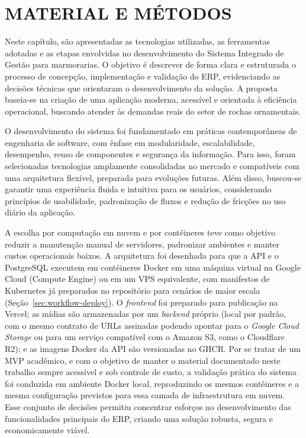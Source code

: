 \chapter{MATERIAL E MÉTODOS}\label{cap3MatMet}
Neste capítulo, são apresentadas as tecnologias utilizadas, as ferramentas adotadas e as etapas envolvidas no desenvolvimento do Sistema Integrado de Gestão para marmorarias. O objetivo é descrever de forma clara e estruturada o processo de concepção, implementação e validação do ERP, evidenciando as decisões técnicas que orientaram o desenvolvimento da solução. A proposta baseia-se na criação de uma aplicação moderna, acessível e orientada à eficiência operacional, buscando atender às demandas reais do setor de rochas ornamentais.

O desenvolvimento do sistema foi fundamentado em práticas contemporâneas de engenharia de software, com ênfase em modularidade, escalabilidade, desempenho, reuso de componentes e segurança da informação. Para isso, foram selecionadas tecnologias amplamente consolidadas no mercado e compatíveis com uma arquitetura flexível, preparada para evoluções futuras. Além disso, buscou-se garantir uma experiência fluida e intuitiva para os usuários, considerando princípios de usabilidade, padronização de fluxos e redução de fricções no uso diário da aplicação.

A escolha por computação em nuvem e por contêineres teve como objetivo reduzir a manutenção manual de servidores, padronizar ambientes e manter custos operacionais baixos. A arquitetura foi desenhada para que a API e o PostgreSQL executem em contêineres Docker em uma máquina virtual na Google Cloud (Compute Engine) ou em um VPS equivalente, com manifestos de Kubernetes já preparados no repositório para cenários de maior escala (Seção~\ref{sec:workflow-deploy}). O \textit{frontend} foi preparado para publicação na Vercel; as mídias são armazenadas por um \textit{backend} próprio (local por padrão, com o mesmo contrato de URLs assinadas podendo apontar para o \textit{Google Cloud Storage} ou para um serviço compatível com o Amazon S3, como o Cloudflare R2); e as imagens Docker da API são versionadas no GHCR. Por se tratar de um MVP acadêmico, e com o objetivo de manter o material documentado neste trabalho sempre acessível e sob controle de custo, a validação prática do sistema foi conduzida em ambiente Docker local, reproduzindo os mesmos contêineres e a mesma configuração previstos para essa camada de infraestrutura em nuvem. Esse conjunto de decisões permitiu concentrar esforços no desenvolvimento das funcionalidades principais do ERP, criando uma solução robusta, segura e economicamente viável.

